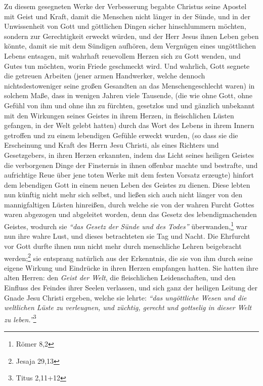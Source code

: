 Zu diesem gesegneten Werke der Verbesserung begabte Christus seine Apostel mit
Geist und Kraft, damit die Menschen nicht länger in der Sünde, und in der
Unwissenheit von Gott und göttlichen Dingen sicher hinschlummern möchten,
sondern zur Gerechtigkeit erweckt würden, und der Herr Jesus ihnen Leben geben
könnte, damit sie mit dem Sündigen aufhören, dem Vergnügen eines ungöttlichen
Lebens
entsagen, mit wahrhaft reuevollem Herzen sich zu Gott wenden, und Gutes tun
möchten, worin Friede geschmeckt wird. Und wahrlich, Gott segnete die getreuen
Arbeiten (jener armen Handwerker, welche dennoch nichtsdestoweniger seine
großen Gesandten an das Menschengeschlecht waren) in solchem Maße, dass in
wenigen Jahren viele Tausende, (die wie ohne Gott, ohne Gefühl von ihm und ohne
ihn
zu fürchten, gesetzlos und und gänzlich unbekannt mit den Wirkungen seines
Geistes in ihrem Herzen, in fleischlichen Lüsten gefangen, in der Welt gelebt
hatten) durch das Wort des Lebens in ihrem Innern getroffen und zu einem
lebendigen Gefühle erweckt wurden, (so dass sie die Erscheinung und Kraft des
Herrn Jesu Christi, als eines Richters und Gesetzgebers, in ihren Herzen
erkannten, indem das Licht seines heiligen Geistes die verborgenen Dinge der
Finsternis in ihnen offenbar machte und bestrafte, und aufrichtige Reue über
jene toten Werke mit dem festen Vorsatz erzeugte) hinfort dem lebendigen Gott
in einem neuen Leben des Geistes zu dienen. Diese lebten nun künftig nicht mehr
sich selbst, und ließen sich auch nicht länger von den mannigfaltigen Lüsten
hinreißen, durch welche sie von der wahren Furcht Gottes waren abgezogen und
abgeleitet worden, denn das Gesetz des lebendigmachenden Geistes, wodurch sie
\textit{"`das Gesetz der Sünde und des Todes"'} überwanden,\footnote{Römer 8,2}
 war nun
ihre wahre Lust, und dieses betrachteten sie Tag und Nacht. Die Ehrfurcht vor
Gott durfte ihnen nun nicht mehr durch menschliche Lehren beigebracht
werden;\footnote{Jesaja 29,13}  sie entsprang
natürlich aus der Erkenntnis, die sie von
ihm durch seine eigene Wirkung und Eindrücke in ihren Herzen empfangen
hatten. Sie hatten ihre alten Herren: den \textit{Geist der Welt}, die
fleischlichen
Leidenschaften, und den Einfluss des Feindes ihrer Seelen verlassen, und sich
ganz der heiligen Leitung der Gnade Jesu Christi ergeben, welche sie lehrte:
\textit{"`das ungöttliche Wesen und die weltlichen Lüste zu verleugnen, und
züchtig, gerecht und gottselig in dieser Welt zu leben."'}\footnote{Titus
2,11+12}
